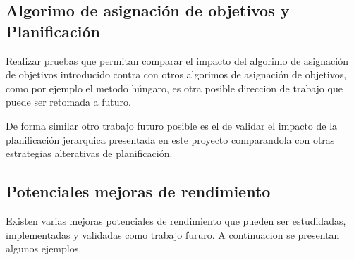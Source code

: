 






\subsection{Algorimo de asignación de objetivos y Planificación}

Realizar pruebas que permitan comparar el impacto del algorimo de asignación de
objetivos introducido contra con otros algorimos de asignación de objetivos,
como por ejemplo el metodo húngaro, es otra posible direccion de trabajo que
puede ser retomada a futuro.

De forma similar otro trabajo futuro posible es el de validar el impacto de la
planificación jerarquica presentada en este proyecto comparandola con otras
estrategias alterativas de planificación. 

\subsection{Potenciales mejoras de rendimiento}


Existen varias mejoras potenciales de rendimiento que pueden ser estudidadas,
implementadas y validadas como trabajo fururo. A continuacion se presentan
algunos ejemplos.

